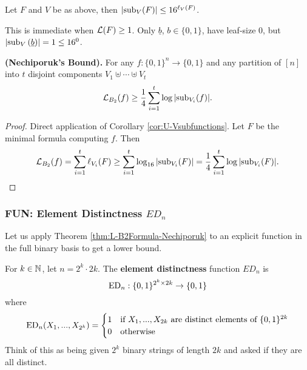 \documentclass[11pt]{article}
\begin{document}
	\begin{corollary}
		\label{cor:U-Vsubfunctions}
		Let $F$ and $V$ be as above, then $|\mathrm{sub}_V(F)| \leq 16^{\ell_V(F)}$.
	\end{corollary}
	This is immediate when $\mathcal{L}(F) \geq 1$. Only $\underline{b}$, $b \in \{0,1\}$, have leaf-size $0$, but $\left|\mathrm{sub}_V\left(\underline{b}\right)\right| = 1 \leq 16^{0}$. 
	
	\begin{theorem}
		\label{thm:L-B2Formula-Nechiporuk}
		\textbf{(Nechiporuk's Bound).} For any $f: \{0,1\}^n \rightarrow \{0,1\}$ and any partition of $[n]$ into $t$ disjoint components $V_1 \uplus \cdots \uplus V_t$
		\[\mathcal{L}_{B_2}(f) \geq \frac{1}{4}\sum_{i = 1}^{t}\log|\mathrm{sub}_{V_i}(f)|.\]
	\end{theorem}
	\begin{proof}
		Direct application of Corollary \ref{cor:U-Vsubfunctions}. Let $F$ be the minimal formula computing $f$. Then
		\[\mathcal{L}_{B_2}(f) = \sum_{i = 1}^{t}\ell_{V_i}(F) \geq \sum_{i = 1}^{t}\log_{16}|\mathrm{sub}_{V_i}(F)| = \frac{1}{4} \sum_{i = 1}^{t}\log|\mathrm{sub}_{V_i}(F)|.\]
	\end{proof}
	
	\subsubsection{FUN: Element Distinctness \texorpdfstring{$ED_n$}{EDn}}
	Let us apply Theorem \ref{thm:L-B2Formula-Nechiporuk} to an explicit function in the full binary basis to get a lower bound.
	\begin{definition}
		\label{def:FUN-elementdistinctness}
		For $k \in \mathbb{N}$, let $n = 2^k \cdot 2k$. The \textbf{element distinctness} function $ED_n$ is
		\[\mathrm{ED}_n: \{0,1\}^{2^k \times 2k} \rightarrow \{0,1\}\] where
		\[\mathrm{ED}_n(X_1, ..., X_{2^k}) = \begin{cases}
		1 &\mbox{if $X_1, ..., X_{2k}$ are distinct elements of $\{0,1\}^{2k}$}\\
		0 &\mbox{otherwise}
		\end{cases}\]
		Think of this as being given $2^k$ binary strings of length $2k$ and asked if they are all distinct.
	\end{definition} 
	
\end{document}

